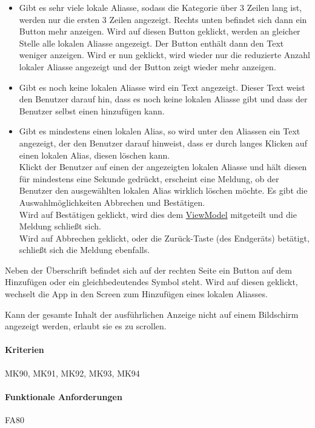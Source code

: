 \begin{itemize}
\begin{itemize}
        \item Gibt es sehr viele lokale Aliasse, sodass die Kategorie über 3 Zeilen lang ist, werden nur 
        die ersten 3 Zeilen angezeigt. Rechts unten befindet sich dann ein Button \dq{}mehr anzeigen\dq{}. 
        Wird auf diesen Button geklickt, werden an gleicher Stelle alle lokalen Aliasse angezeigt. 
        Der Button enthält dann den Text \dq{}weniger anzeigen\dq{}. Wird er nun geklickt, wird wieder nur die 
        reduzierte Anzahl lokaler Aliasse angezeigt und der Button zeigt wieder \dq{}mehr anzeigen\dq{}.
        \item Gibt es noch keine lokalen Aliasse wird ein Text angezeigt. Dieser Text weist den Benutzer 
        darauf hin, dass es noch keine lokalen Aliasse gibt und dass der Benutzer selbst einen hinzufügen kann.
        \item Gibt es mindestens einen lokalen Alias, so wird unter den Aliassen ein Text angezeigt, 
        der den Benutzer darauf hinweist, dass er durch langes Klicken auf einen lokalen Alias, diesen 
        löschen kann.\\
        Klickt der Benutzer auf einen der angezeigten lokalen Aliasse und hält diesen für mindestens eine 
        Sekunde gedrückt, erscheint eine Meldung, ob der Benutzer den ausgewählten lokalen Alias wirklich 
        löschen möchte. Es gibt die Auswahlmöglichkeiten \dq{}Abbrechen\dq{} und \dq{}Bestätigen\dq{}.\\ 
        Wird auf \dq{}Bestätigen\dq{} geklickt, wird dies dem \hyperref[App_ViewModel]{ViewModel} mitgeteilt und die Meldung schließt sich.\\
        Wird auf \dq{}Abbrechen\dq{} geklickt, oder die Zurück-Taste (des Endgeräts) betätigt, schließt sich die Meldung ebenfalls.
    \end{itemize}
    Neben der Überschrift befindet sich auf der rechten Seite ein Button auf dem \dq{}Hinzufügen\dq{} oder ein gleichbedeutendes Symbol steht. 
    Wird auf diesen geklickt, wechselt die App in den Screen zum Hinzufügen eines lokalen Aliasses.
\end{itemize}
Kann der gesamte Inhalt der ausführlichen Anzeige nicht auf einem Bildschirm angezeigt werden, erlaubt sie es zu scrollen.
\paragraph{Kriterien}
MK90, MK91, MK92, MK93, MK94
\paragraph{Funktionale Anforderungen}
FA80


